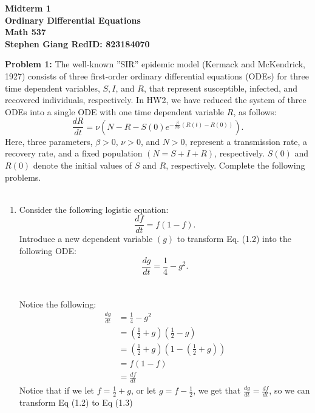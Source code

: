 \documentclass[11pt]{article}
\newcommand{\skipline}{\vspace{\baselineskip}}
\newenvironment{problem}[1]{\textbf{Problem #1: }}{\newpage}
\begin{document}
	\begin{center}
		\textbf{Midterm 1} \\
		\textbf{Ordinary Differential Equations} \\
		\textbf{Math 537} \\
		\textbf{Stephen Giang RedID: 823184070} \\
		\skipline \skipline
	\end{center}

	\begin{problem}{1}
		The well-known ”SIR” epidemic model (Kermack and McKendrick, 1927) consists of three first-order ordinary differential equations (ODEs) for three time dependent variables, $S, I$, and $R$, that represent susceptible, infected, and recovered individuals, respectively. In HW2, we have reduced the system of three ODEs into a single ODE with one time
		dependent variable $R$, as follows:
		\[\frac{dR}{dt} = \nu \left(N - R - S(0)e^{-\frac{\beta}{N \nu}(R(t) - R(0))}\right). \tag{1.1}\]
		Here, three parameters, $\beta > 0$, $\nu > 0$, and $N > 0$, represent a transmission rate, a recovery rate, and a fixed population $(N = S + I + R)$, respectively. $S(0)$ and $R(0)$ denote the initial values of $S$ and $R$, respectively. Complete the following problems.
		\\ \\
		\begin{enumerate}[label = (\alph*)]
			\item Consider the following logistic equation:
			\[\frac{df}{dt} = f(1-f) \tag{1.2}.\]
			Introduce a new dependent variable $(g)$ to transform Eq. (1.2) into the following ODE:
			\[\frac{dg}{dt} = \frac{1}{4} - g^2. \tag{1.3}\]
			\\ \\
			Notice the following:
			\begin{align*}
				\frac{dg}{dt} &= \frac{1}{4} - g^2 \\
				&= \left(\frac{1}{2} + g\right)\left(\frac{1}{2} - g\right) \\
				&= \left(\frac{1}{2} + g\right)\left(1 - \left(\frac{1}{2} + g\right)\right) \\
				&= f (1 - f) \\
				&= \frac{df}{dt}
			\end{align*}
			Notice that if we let $f = \frac{1}{2} + g$, or let $g = f - \frac{1}{2}$, we get that $\frac{dg}{dt} = \frac{df}{dt}$, so we can transform Eq (1.2) to Eq (1.3)
			\newpage
			

\end{enumerate}
\end{problem}
\end{document}
